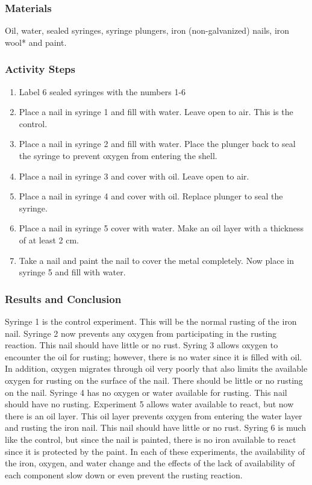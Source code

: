 \subsubsection*{Materials}
Oil, water, sealed syringes, syringe plungers, iron (non-galvanized) nails, iron wool* and paint.

\subsubsection*{Activity Steps}
\begin{enumerate}
\item{Label 6 sealed syringes with the numbers 1-6}
\item{Place a nail in syringe 1 and fill with water. Leave open to air. This is the control.}
\item{Place a nail in syringe 2 and fill with water. Place the plunger back to seal the syringe to prevent oxygen from entering the shell.}
\item{Place a nail in syringe 3 and cover with oil. Leave open to air.}
\item{Place a nail in syringe 4 and cover with oil. Replace plunger to seal the syringe.}
\item{Place a nail in syringe 5 cover with water. Make an oil layer with a thickness of at least 2 cm.}
\item{Take a nail and paint the nail to cover the metal completely. Now place in syringe 5 and fill with water.}
\end{enumerate}


\subsubsection*{Results and Conclusion}  
Syringe 1 is the control experiment. This will be the normal rusting of the iron nail. Syringe 2 now prevents any oxygen from participating in the rusting reaction. This nail should have little or no rust. Syring 3 allows oxygen to encounter the oil for rusting; however, there is no water since it is filled with oil. In addition, oxygen migrates through oil very poorly that also limits the available oxygen for rusting on the surface of the nail. There should be little or no rusting on the nail. Syringe 4 has no oxygen or water available for rusting. This nail should have no rusting. Experiment 5 allows water available to react, but now there is an oil layer. This oil layer prevents oxygen from entering the water layer and rusting the iron nail. This nail should have little or no rust. Syring 6 is much like the control, but since the nail is painted, there is no iron available to react since it is protected by the paint. In each of these experiments, the availability of the iron, oxygen, and water change and the effects of the lack of availability of each component slow down or even prevent the rusting reaction.

